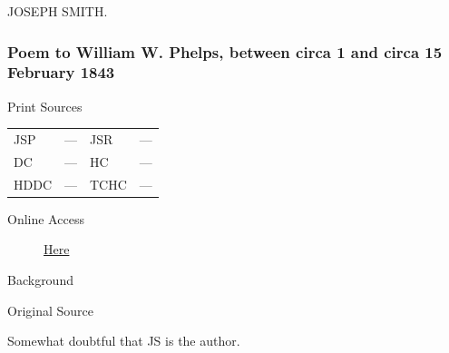 				\begin{tightright}
					JOSEPH SMITH.
				\end{tightright}
				
		\subsubsection{Poem to William W. Phelps, between circa 1 and circa 15 February 1843}
			\label{EMS-1843-JS-CIR-1-CIR-15-FEB-1843}
			
			\begin{description}
				\item[Print Sources]
			\end{description}

				\begin{tabular}{p{0.5in}p{1in}p{0.5in}p{1in}}
				JSP	 	& ---		& JSR 		& --- \\
				DC	 	& ---		& HC 		& --- \\
				HDDC 	& ---		& TCHC 		& --- \\
				\end{tabular}
			
			\begin{description}
				\item[Online Access] \href{https://www.josephsmithpapers.org/paper-summary/poem-to-william-w-phelps-between-circa-1-and-circa-15-february-1843/1}{Here}
			\end{description}
			
			\begin{description}
				\item[Background]
			\end{description}
			
			
			\begin{description}
				\item[Original Source]
			\end{description}
			
				Somewhat doubtful that JS is the author.
			
